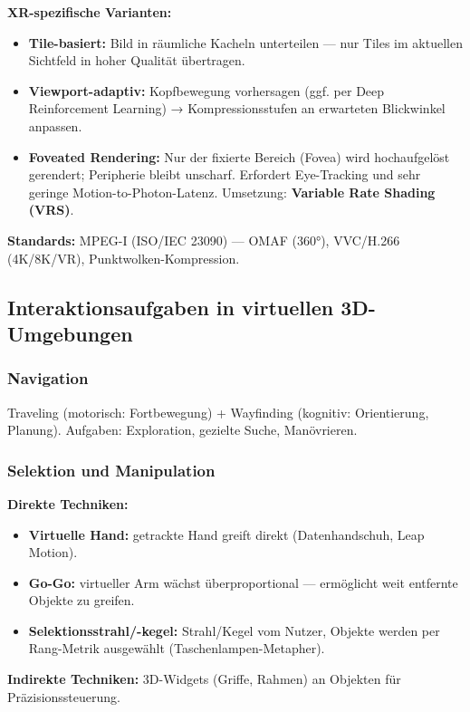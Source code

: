 \documentclass[12pt, a4paper]{article}
\begin{document}
\textbf{XR-spezifische Varianten:}
\begin{itemize}
  \item \textbf{Tile-basiert:} Bild in räumliche Kacheln unterteilen — nur Tiles im aktuellen Sichtfeld in hoher Qualität übertragen.
  \item \textbf{Viewport-adaptiv:} Kopfbewegung vorhersagen (ggf. per Deep Reinforcement Learning) → Kompressionsstufen an erwarteten Blickwinkel anpassen.
  \item \textbf{Foveated Rendering:} Nur der fixierte Bereich (Fovea) wird hochaufgelöst gerendert; Peripherie bleibt unscharf. Erfordert Eye-Tracking und sehr geringe Motion-to-Photon-Latenz. Umsetzung: \textbf{Variable Rate Shading (VRS)}.
\end{itemize}

\textbf{Standards:} MPEG-I (ISO/IEC 23090) — OMAF (360°), VVC/H.266 (4K/8K/VR), Punktwolken-Kompression.

\subsection{Interaktionsaufgaben in virtuellen 3D-Umgebungen}

\subsubsection*{Navigation}
Traveling (motorisch: Fortbewegung) + Wayfinding (kognitiv: Orientierung, Planung). Aufgaben: Exploration, gezielte Suche, Manövrieren.

\subsubsection*{Selektion und Manipulation}

\textbf{Direkte Techniken:}
\begin{itemize}
  \item \textbf{Virtuelle Hand:} getrackte Hand greift direkt (Datenhandschuh, Leap Motion).
  \item \textbf{Go-Go:} virtueller Arm wächst überproportional — ermöglicht weit entfernte Objekte zu greifen.
  \item \textbf{Selektionsstrahl/-kegel:} Strahl/Kegel vom Nutzer, Objekte werden per Rang-Metrik ausgewählt (Taschenlampen-Metapher).
\end{itemize}

\textbf{Indirekte Techniken:} 3D-Widgets (Griffe, Rahmen) an Objekten für Präzisionssteuerung.
\end{document}

